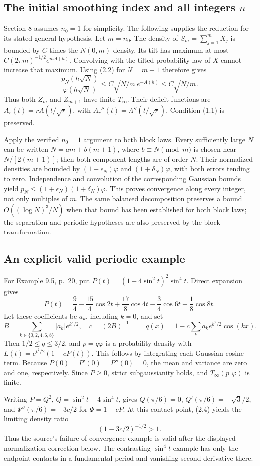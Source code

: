 \documentclass[10pt]{article}
\begin{document}
\subsection*{The initial smoothing index and all integers \(n\)}
Section 8 assumes \(n_0=1\) for simplicity. The following supplies the reduction for its stated general hypothesis. Let \(m=n_0\). The density of \(S_m=\sum_{j=1}^mX_j\) is bounded by \(C\) times the \(N(0,m)\) density. Its tilt has maximum at most \(C(2\pi m)^{-1/2}e^{mA(h)}\). Convolving with the tilted probability law of \(X\) cannot increase that maximum. Using (2.2) for \(N=m+1\) therefore gives \[\frac{p_N(h\sqrt N)}{\varphi(h\sqrt N)}
 \le C\sqrt{N/m}\,e^{-A(h)}\le C\sqrt{N/m}.                \tag{2.5}\] Thus both \(Z_m\) and \(Z_{m+1}\) have finite \(T_\infty\). Their deficit functions are \(A_r(t)=rA(t/\sqrt r)\), with \(A_r''(t)=A''(t/\sqrt r)\). Condition (1.1) is preserved.\par
Apply the verified \(n_0=1\) argument to both block laws. Every sufficiently large \(N\) can be written \(N=am+b(m+1)\), where \(b\equiv N\pmod m\) is chosen near \(N/[2(m+1)]\); then both component lengths are of order \(N\). Their normalized densities are bounded by \((1+\epsilon_N)\varphi\) and \((1+\delta_N)\varphi\), with both errors tending to zero. Independence and convolution of the corresponding Gaussian bounds yield \(p_N\le(1+\epsilon_N)(1+\delta_N)\varphi\). This proves convergence along every integer, not only multiples of \(m\). The same balanced decomposition preserves a bound \(O((\log N)^3/N)\) when that bound has been established for both block laws; the separation and periodic hypotheses are also preserved by the block transformation.\par
\subsection*{An explicit valid periodic example}
For Example 9.5, p. 20, put \(P(t)=(1-4\sin^2t)^2\sin^4t\). Direct expansion gives \[P(t)=\frac94-\frac{15}4\cos2t+\frac{17}8\cos4t
                   -\frac34\cos6t+\frac18\cos8t.\] Let these coefficients be \(a_k\), including \(k=0\), and set \[B=\sum_{k\in\{0,2,4,6,8\}}|a_k|e^{k^2/2},\quad c=(2B)^{-1},
 \qquad q(x)=1-c\sum_k a_ke^{k^2/2}\cos(kx).\] Then \(1/2\le q\le3/2\), and \(p=q\varphi\) is a probability density with \(L(t)=e^{t^2/2}(1-cP(t))\). This follows by integrating each Gaussian cosine term. Because \(P(0)=P'(0)=P''(0)=0\), the mean and variance are zero and one, respectively. Since \(P\ge0\), strict subgaussianity holds, and \(T_\infty(p\Vert\varphi)\) is finite.\par
Writing \(P=Q^2\), \(Q=\sin^2t-4\sin^4t\), gives \(Q(\pi/6)=0\), \(Q'(\pi/6)=-\sqrt3/2\), and \(\Psi''(\pi/6)=-3c/2\) for \(\Psi=1-cP\). At this contact point, (2.4) yields the limiting density ratio \[(1-3c/2)^{-1/2}>1.\] Thus the source’s failure-of-convergence example is valid after the displayed normalization correction below. The contrasting \(\sin^4t\) example has only the endpoint contacts in a fundamental period and vanishing second derivative there.\par
\end{document}
